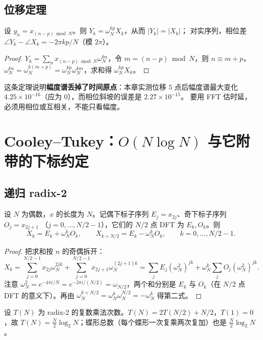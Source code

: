\subsection{位移定理}

\begin{theorem}[位移只改相位]
\label{thm:shift}
设 $y_n=x_{(n-p)\bmod N}$。则 $Y_k=\omega_N^{kp}X_k$，从而 $|Y_k|=|X_k|$；
对实序列，相位差 $\angle Y_k-\angle X_k=-2\pi kp/N$（模 $2\pi$）。
\end{theorem}

\begin{proof}
$Y_k=\sum_n x_{(n-p)\bmod N}\omega_N^{kn}$，令 $m=(n-p)\bmod N$，则 $n\equiv m+p$，
$\omega_N^{kn}=\omega_N^{k(m+p)}=\omega_N^{kp}\omega_N^{km}$，求和得 $\omega_N^{kp}X_k$。
\end{proof}

这条定理说明\textbf{幅度谱丢掉了时间原点}：本章实测位移 $5$ 点后幅度谱最大变化
$4.25\times10^{-16}$（应为 $0$），而相位斜坡的误差是 $2.27\times10^{-15}$。
要用 FFT 估时延，必须用相位或互相关，不能只看幅度。

\section{Cooley--Tukey：$O(N\log N)$ 与它附带的下标约定}

\subsection{递归 radix-2}

\begin{theorem}
\label{thm:dit}
设 $N$ 为偶数，$x$ 的长度为 $N$。记偶下标子序列 $E_j=x_{2j}$、奇下标子序列 $O_j=x_{2j+1}$
（$j=0,\dots,N/2-1$），它们的 $N/2$ 点 DFT 为 $E_k,O_k$。则
\[
X_k=E_k+\omega_N^kO_k,\qquad X_{k+N/2}=E_k-\omega_N^kO_k,\qquad k=0,\dots,N/2-1 .
\]
\end{theorem}

\begin{proof}
把求和按 $n$ 的奇偶拆开：
\[
X_k=\sum_{j=0}^{N/2-1}x_{2j}\omega_N^{2jk}+\sum_{j=0}^{N/2-1}x_{2j+1}\omega_N^{(2j+1)k}
=\sum_j E_j(\omega_N^2)^{jk}+\omega_N^k\sum_j O_j(\omega_N^2)^{jk}.
\]
注意 $\omega_N^2=e^{-4\pi i/N}=e^{-2\pi i/(N/2)}=\omega_{N/2}$，两个和分别是
$E_k$ 与 $O_k$（在 $N/2$ 点 DFT 的意义下）。再由
$\omega_N^{k+N/2}=\omega_N^k\omega_N^{N/2}=-\omega_N^k$ 得第二式。
\end{proof}

\begin{corollary}[运算量]
\label{cor:complexity}
设 $T(N)$ 为 radix-2 的复数乘法次数。$T(N)=2T(N/2)+N/2$，$T(1)=0$，故
$T(N)=\tfrac N2\log_2N$；蝶形总数（每个蝶形一次复乘两次复加）也是 $\tfrac N2\log_2N$。
\end{corollary}

